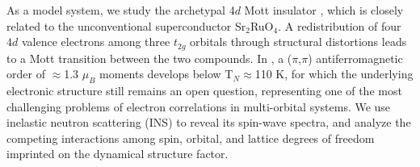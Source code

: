 As a model system, we study the archetypal 4$d$ Mott insulator \CROns, which is closely related to the unconventional superconductor Sr$_2$RuO$_4$. A redistribution of four $4d$ valence electrons among three $t_{2g}$ orbitals through structural distortions leads to a Mott transition between the two compounds. In \CROns, a ($\pi$,$\pi$) antiferromagnetic order of $\approx$1.3 $\mu_B$ moments develops below T$_N$$\approx$110 K, for which the underlying electronic structure still remains an open question, representing one of the most challenging problems of electron correlations in multi-orbital systems. We use  inelastic neutron scattering (INS) to reveal its spin-wave spectra, and analyze the competing interactions among spin, orbital, and lattice degrees of freedom imprinted on the dynamical structure factor.  
